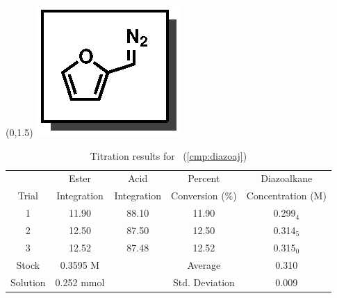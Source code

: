 \begin{singlespace}
\begin{table}[htbp]
\begin{textblock}{1}(0,1.5)
\includegraphics[scale=0.8]{chp_asymmetric/images/diazoaj}
\end{textblock}
\flushright
{\small
\begin{tabular}{ccccc} 
\toprule
&Ester&Acid&Percent&Diazoalkane\\
Trial&Integration&Integration&Conversion (\%)&Concentration (M) \\ 
\midrule
1 & 11.90 & 88.10 & 11.90 & 0.299$_4$ \\
2 & 12.50 & 87.50 & 12.50 & 0.314$_5$ \\
3 & 12.52 & 87.48 & 12.52 & 0.315$_0$ \\
\midrule
Stock & 0.3595 M & & Average & 0.310 \\
Solution & 0.252 mmol & & Std. Deviation & 0.009 \\
\bottomrule
\end{tabular}
\caption{Titration results for \CMPdiazoaj~(\ref{cmp:diazoaj})}
}
\end{table}
\end{singlespace}

